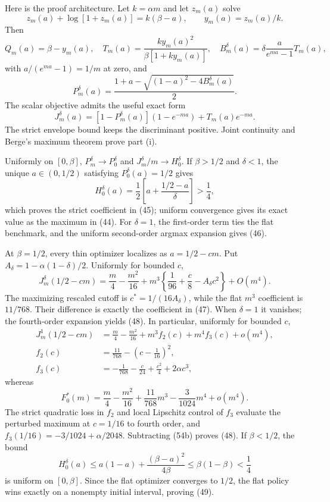 \documentclass[mnsc,dblanonrev]{informs4}
\begin{document}
Here is the proof architecture.  Let $k=\alpha m$ and let $z_m(a)$ solve
\[
 z_m(a)+\log[1+z_m(a)]=k(\beta-a),
 \qquad y_m(a)=z_m(a)/k.
\]
Then
\[
 Q_m(a)=\beta-y_m(a),\quad
 T_m(a)=\frac{k y_m(a)^2}{\beta[1+k y_m(a)]},\quad
 B_m^\delta(a)=\delta\frac{a}{e^{ma}-1}T_m(a),             \tag{51}
\]
with $a/(e^{ma}-1)=1/m$ at zero, and
\[
 P_m^\delta(a)=
 \frac{1+a-\sqrt{(1-a)^2-4B_m^\delta(a)}}2.               \tag{52}
\]
The scalar objective admits the useful exact form
\[
 J_m^\delta(a)
 =[1-P_m^\delta(a)](1-e^{-ma})+T_m(a)e^{-ma}.              \tag{53}
\]
The strict envelope bound keeps the discriminant positive.  Joint
continuity and Berge's maximum theorem prove part (i).

Uniformly on $[0,\beta]$, $P_m^\delta\to P_0^\delta$ and
$J_m^\delta/m\to H_0^\delta$.  If $\beta>1/2$ and $\delta<1$, the unique
$a\in(0,1/2)$ satisfying $P_0^\delta(a)=1/2$ gives
\[
 H_0^\delta(a)=\frac12\left[a+\frac{1/2-a}{\delta}\right]
 >\frac14,
\]
which proves the strict coefficient in (45); uniform convergence gives its
exact value as the maximum in (44).  For $\delta=1$, the first-order term
ties the flat benchmark, and the uniform second-order argmax expansion gives
(46).

At $\beta=1/2$, every thin optimizer localizes as $a=1/2-cm$.  Put
$A_\delta=1-\alpha(1-\delta)/2$.  Uniformly for bounded $c$,
\[
 J_m^\delta(1/2-cm)
 =\frac m4-\frac{m^2}{16}
 +m^3\left\{\frac1{96}+\frac c8-A_\delta c^2\right\}
 +O(m^4).                                                   \tag{54}
\]
The maximizing rescaled cutoff is $c^*=1/(16A_\delta)$, while the flat
$m^3$ coefficient is $11/768$.  Their difference is exactly the coefficient
in (47).  When $\delta=1$ it vanishes; the fourth-order expansion yields
(48).  In particular, uniformly for bounded $c$,
\[
 \begin{aligned}
 J_m^1(1/2-cm)
 &=\frac m4-\frac{m^2}{16}+m^3 f_2(c)+m^4 f_3(c)+o(m^4),\\
 f_2(c)&=\frac{11}{768}-\left(c-\frac1{16}\right)^2,\\
 f_3(c)&=-\frac1{768}-\frac c{24}+\frac{c^2}{4}+2\alpha c^3,
 \end{aligned}                                             \tag{54a}
\]
whereas
\[
 F_0^*(m)=\frac m4-\frac{m^2}{16}
 +\frac{11}{768}m^3-\frac3{1024}m^4+o(m^4).              \tag{54b}
\]
The strict quadratic loss in $f_2$ and local Lipschitz control of $f_3$
evaluate the perturbed maximum at $c=1/16$ to fourth order, and
$f_3(1/16)=-3/1024+\alpha/2048$.  Subtracting (54b) proves (48).
If $\beta<1/2$, the bound
\[
 H_0^\delta(a)
 \le a(1-a)+\frac{(\beta-a)^2}{4\beta}
 \le\beta(1-\beta)<\frac14
\]
is uniform on $[0,\beta]$.  Since the flat optimizer converges to $1/2$,
the flat policy wins exactly on a nonempty initial interval, proving (49).
\end{document}
